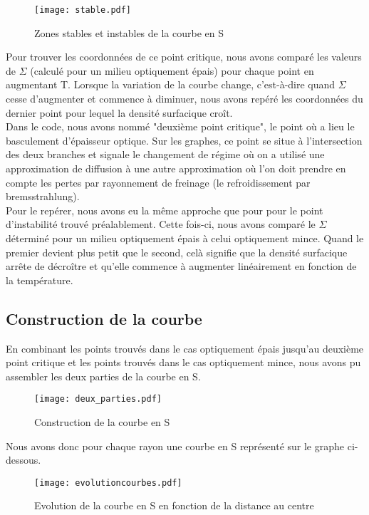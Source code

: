 \begin{figure}[htb!]
	\centering
	\texttt{[image: stable.pdf]}
	\caption{Zones stables et instables de la courbe en S}
	\label{Fig::Stable}
\end{figure}

Pour trouver les coordonnées de ce point critique, nous avons comparé les valeurs de $\Sigma$ (calculé pour un milieu optiquement épais) pour chaque point en augmentant T. Lorsque la variation de la courbe change, c'est-à-dire quand $\Sigma$ cesse d'augmenter et commence à diminuer, nous avons repéré les coordonnées du dernier point pour lequel la densité surfacique croît.  
\\
Dans le code, nous avons nommé "deuxième point critique", le point où a lieu le basculement d'épaisseur optique. Sur les graphes, ce point se situe à l'intersection des deux branches et signale le changement de régime où on a utilisé une approximation de diffusion à une autre approximation où l'on doit prendre en compte les pertes par rayonnement de freinage (le refroidissement par bremsstrahlung).
\\
Pour le repérer, nous avons eu la même approche que pour pour le point d'instabilité trouvé préalablement. Cette fois-ci, nous avons comparé le $\Sigma$ déterminé pour un milieu optiquement épais à celui optiquement mince. Quand le premier devient plus petit que le second, celà signifie que la densité surfacique arrête de décroître et qu'elle commence à augmenter linéairement en fonction de la température. 
\\

\subsection{Construction de la courbe}

En combinant les points trouvés dans le cas optiquement épais jusqu'au deuxième point critique et les points trouvés dans le cas optiquement mince, nous avons pu assembler les deux parties de la courbe en S.

\begin{figure}[htb!]
	\centering
	\texttt{[image: deux\_parties.pdf]}
	\caption{Construction de la courbe en S}
	\label{Fig::bench}
\end{figure}


Nous avons donc pour chaque rayon une courbe en S représenté sur le graphe ci-dessous.
\begin{figure}[htb!]
	\centering
	\texttt{[image: evolutioncourbes.pdf]}
	\caption{Evolution de la courbe en S en fonction de la distance au centre}
	\label{Fig::bench}
\end{figure}



